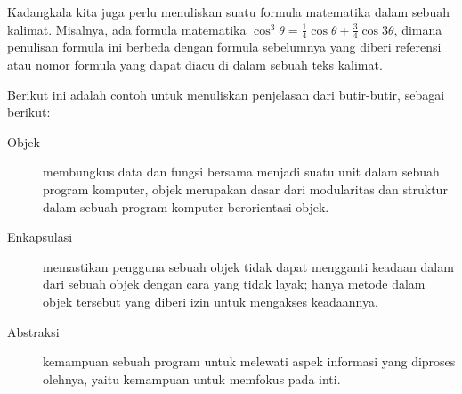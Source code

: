 Kadangkala kita juga perlu menuliskan suatu formula matematika dalam sebuah kalimat. Misalnya, ada formula matematika $\cos^3 \theta =\frac{1}{4}\cos\theta+\frac{3}{4}\cos 3\theta$, dimana penulisan formula ini berbeda dengan formula sebelumnya yang diberi referensi atau nomor formula yang dapat diacu di dalam sebuah teks kalimat.

Berikut ini adalah contoh untuk menuliskan penjelasan dari butir-butir, sebagai berikut:
\begin{description}
\item[Objek] membungkus data dan fungsi bersama menjadi suatu unit dalam sebuah program komputer, objek merupakan dasar dari modularitas dan struktur dalam sebuah program komputer berorientasi objek.
\item[Enkapsulasi] memastikan pengguna sebuah objek tidak dapat mengganti keadaan dalam dari sebuah objek dengan cara yang tidak layak; hanya metode dalam objek tersebut yang diberi izin untuk mengakses keadaannya. 
\item[Abstraksi]  kemampuan sebuah program untuk melewati aspek informasi yang diproses olehnya, yaitu kemampuan untuk memfokus pada inti. 
\end{description}

